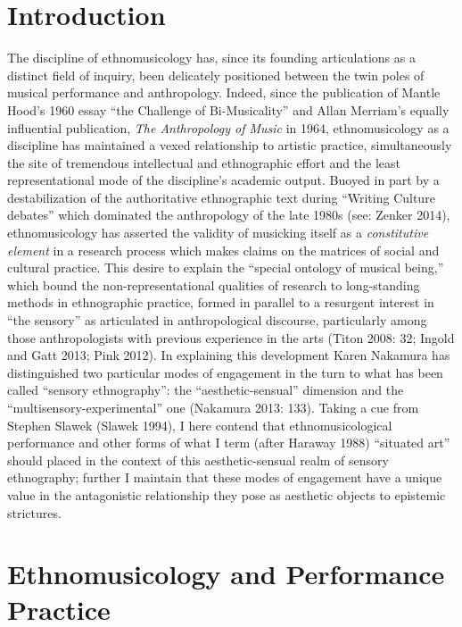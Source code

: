 \hypertarget{introduction}{%
\section{Introduction}\label{introduction}}

The discipline of ethnomusicology has, since its founding articulations
as a distinct field of inquiry, been delicately positioned between the
twin poles of musical performance and anthropology. Indeed, since the
publication of Mantle Hood's 1960 essay ``the Challenge of
Bi-Musicality'' and Allan Merriam's equally influential publication,
\emph{The Anthropology of Music} in 1964, ethnomusicology as a
discipline has maintained a vexed relationship to artistic practice,
simultaneously the site of tremendous intellectual and ethnographic
effort and the least representational mode of the discipline's academic
output. Buoyed in part by a destabilization of the authoritative
ethnographic text during ``Writing Culture debates'' which dominated the
anthropology of the late 1980s (see: Zenker 2014), ethnomusicology has
asserted the validity of musicking itself as a \emph{constitutive
element} in a research process which makes claims on the matrices of
social and cultural practice. This desire to explain the ``special
ontology of musical being,'' which bound the non-representational
qualities of research to long-standing methods in ethnographic practice,
formed in parallel to a resurgent interest in ``the sensory'' as
articulated in anthropological discourse, particularly among those
anthropologists with previous experience in the arts (Titon 2008: 32;
Ingold and Gatt 2013; Pink 2012). In explaining this development Karen
Nakamura has distinguished two particular modes of engagement in the
turn to what has been called ``sensory ethnography'': the
``aesthetic-sensual'' dimension and the ``multisensory-experimental''
one (Nakamura 2013: 133). Taking a cue from Stephen Slawek (Slawek
1994), I here contend that ethnomusicological performance and other
forms of what I term (after Haraway 1988) ``situated art'' should placed
in the context of this aesthetic-sensual realm of sensory ethnography;
further I maintain that these modes of engagement have a unique value in
the antagonistic relationship they pose as aesthetic objects to
epistemic strictures.

\hypertarget{ethnomusicology-and-performance-practice}{%
\section{Ethnomusicology and Performance
Practice}\label{ethnomusicology-and-performance-practice}}

